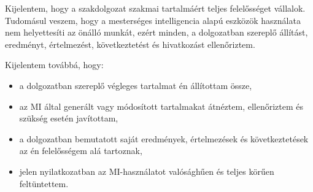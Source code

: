 \documentclass[a4paper,12pt,oneside]{article}
\begin{document}
Kijelentem, hogy a szakdolgozat szakmai tartalmáért teljes felelősséget vállalok. Tudomásul
veszem, hogy a mesterséges intelligencia alapú eszközök használata nem helyettesíti az önálló
munkát, ezért minden, a dolgozatban szereplő állítást, eredményt, értelmezést, következtetést
és hivatkozást ellenőriztem.

Kijelentem továbbá, hogy:
\begin{itemize}
  \item a dolgozatban szereplő végleges tartalmat én állítottam össze,
  \item az MI által generált vagy módosított tartalmakat átnéztem, ellenőriztem és szükség
    esetén javítottam,
  \item a dolgozatban bemutatott saját eredmények, értelmezések és következtetések az én
    felelősségem alá tartoznak,
  \item jelen nyilatkozatban az MI-használatot valósághűen és teljes körűen feltüntettem.
\end{itemize}

\newpage
\printbibliography[heading=bibintoc,title={Hivatkozások}]
\end{document}
